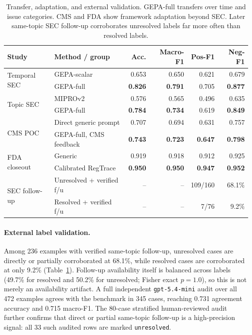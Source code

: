 \documentclass[11pt]{article}
\begin{document}
\begin{table}[t]
\centering
\scriptsize
\setlength{\tabcolsep}{4pt}
\begin{tabular}{llrrrr}
\toprule
\textbf{Study} & \textbf{Method / group} & \textbf{Acc.} & \textbf{Macro-F1} & \textbf{Pos-F1} & \textbf{Neg-F1} \\
\midrule
\multirow{2}{*}{Temporal SEC}
& GEPA-scalar & 0.653 & 0.650 & 0.621 & 0.679 \\
& GEPA-full & \textbf{0.826} & \textbf{0.791} & 0.705 & \textbf{0.877} \\
\midrule
\multirow{2}{*}{Topic SEC}
& MIPROv2 & 0.576 & 0.565 & 0.496 & 0.635 \\
& GEPA-full & \textbf{0.784} & \textbf{0.734} & 0.619 & \textbf{0.849} \\
\midrule
\multirow{2}{*}{CMS POC}
& Direct generic prompt & 0.707 & 0.694 & 0.631 & 0.757 \\
& GEPA-full, CMS feedback & \textbf{0.743} & \textbf{0.723} & \textbf{0.647} & \textbf{0.798} \\
\midrule
\multirow{2}{*}{FDA closeout}
& Generic & 0.919 & 0.918 & 0.912 & 0.925 \\
& Calibrated RegTrace & \textbf{0.950} & \textbf{0.950} & \textbf{0.947} & \textbf{0.952} \\
\midrule
\multirow{2}{*}{SEC follow-up}
& Unresolved + verified f/u & -- & -- & 109/160 & 68.1\% \\
& Resolved + verified f/u & -- & -- & 7/76 & 9.2\% \\
\bottomrule
\end{tabular}
\caption{Transfer, adaptation, and external validation. GEPA-full transfers over time and issue categories. CMS and FDA show framework adaptation beyond SEC. Later same-topic SEC follow-up corroborates unresolved labels far more often than resolved labels.}
\label{tab:transfer}
\end{table}

\paragraph{External label validation.}
Among 236 examples with verified same-topic follow-up, unresolved cases are directly or partially corroborated at 68.1\%, while resolved cases are corroborated at only 9.2\% (Table~\ref{tab:transfer}). Follow-up availability itself is balanced across labels (49.7\% for resolved and 50.2\% for unresolved; Fisher exact $p=1.0$), so this is not merely an availability artifact. A full independent \texttt{gpt-5.4-mini} audit over all 472 examples agrees with the benchmark in 345 cases, reaching 0.731 agreement accuracy and 0.715 macro-F1. The 80-case stratified human-reviewed audit further confirms that direct or partial same-topic follow-up is a high-precision signal: all 33 such audited rows are marked \texttt{unresolved}.
\end{document}
